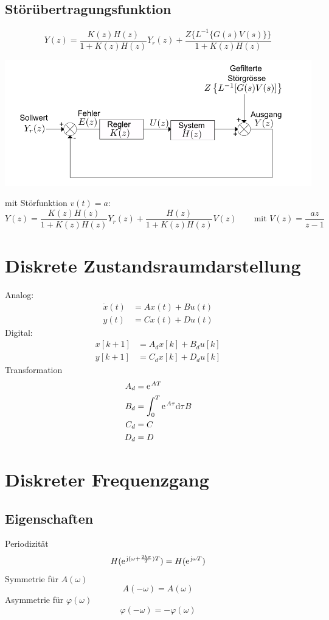 \subsection{Störübertragungsfunktion}
\[
	Y(z) = \frac{K(z)H(z)}{1+K(z)H(z)}Y_r(z)+\frac{Z\{L^{-1}\{G(s)V(s)\}\}}{1+K(z)H(z)}
\]
\begin{center}
	\includegraphics[width=.8\textwidth]{./images/storueb}
\end{center}

mit Störfunktion $v(t) = a$:
\[
	Y(z) = \frac{K(z)H(z)}{1+K(z)H(z)}Y_r(z)+\frac{H(z)}{1+K(z)H(z)}V(z) \qquad \textrm{mit } V(z) = \frac{az}{z-1}
\]

\section{Diskrete Zustandsraumdarstellung}
Analog:
\[\begin{aligned}
	\dot{x}(t) &= Ax(t) + Bu(t)\\
	y(t) &= Cx(t) + Du(t)
\end{aligned}\]
Digital:
\[\begin{aligned}
	x[k+1] &= A_dx[k] + B_du[k]\\
	y[k+1] &= C_dx[k] + D_du[k]
\end{aligned}\]
Transformation
\[\begin{aligned}
	A_d &= \e^{AT}\\
	B_d &= \int_{0}^{T}\e^{A\tau}\di\tau B\\
	C_d &= C\\
	D_d &= D
\end{aligned}\]

\section{Diskreter Frequenzgang}
\subsection{Eigenschaften}
Periodizität
\[
	H(\e^{\im(\omega+\frac{2k\pi}{T})T})=H(\e^{\im\omega T})
\]
Symmetrie für $A(\omega)$
\[
	A(-\omega) = A(\omega)
\]
Asymmetrie für $\varphi(\omega)$
\[
	\varphi(-\omega) = -\varphi(\omega)
\]

